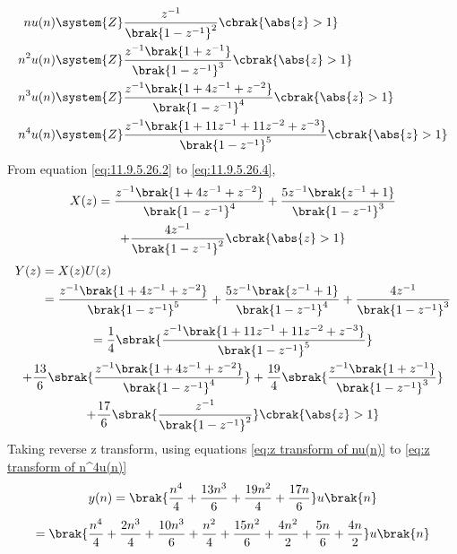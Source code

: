 \documentclass[journal,12pt,twocolumn]{IEEEtran}
\theoremstyle{remark}
\begin{document}
\begin{align}
        n u(n) &\system{Z} \frac{z^{-1}}{\brak{1-z^{-1}}^2} \cbrak{\abs{z}>1} \label{eq:z transform of nu(n)} \\
        n^2 u(n) &\system{Z} \frac{z^{-1}\brak{1+z^{-1}}}{\brak{1-z^{-1}}^3} \cbrak{\abs{z}>1}\label{eq:z transform of n^2u(n)} \\
        n^3 u(n) &\system{Z} \frac{z^{-1}\brak{1+4z^{-1}+z^{-2}}}{\brak{1-z^{-1}}^4} \cbrak{\abs{z}>1}\label{eq:z transform of n^3u(n)} \\
        n^4 u(n) &\system{Z} \frac{z^{-1}\brak{1+11z^{-1}+11z^{-2}+z^{-3}}}{\brak{1-z^{-1}}^5} \cbrak{\abs{z}>1}\label{eq:z transform of n^4u(n)}
    \end{align}
From equation \eqref{eq:11.9.5.26.2} to \eqref{eq:11.9.5.26.4},\\
    \begin{multline}
        X(z) = \frac{z^{-1}\brak{1+4z^{-1}+z^{-2}}}{\brak{1-z^{-1}}^4} + \frac{5z^{-1}\brak{z^{-1}+1}}{\brak{1-z^{-1}}^3}\\ 
        + \frac{4z^{-1}}{\brak{1-z^{-1}}^2} \cbrak{\abs{z}>1}
    \end{multline}
    \begin{align}
         Y(z) &= X(z)U(z)\\
         &=\frac{z^{-1}\brak{1+4z^{-1}+z^{-2}}}{\brak{1-z^{-1}}^5} + \frac{5z^{-1}\brak{z^{-1}+1}}{\brak{1-z^{-1}}^4} + \frac{4z^{-1}}{\brak{1-z^{-1}}^3} 
    \end{align}
    \begin{multline}
        = \frac{1}{4}\sbrak{\frac{z^{-1}\brak{1+11z^{-1}+11z^{-2}+z^{-3}}}{\brak{1-z^{-1}}^5}} \\
        +\frac{13}{6}\sbrak{\frac{z^{-1}\brak{1+4z^{-1}+z^{-2}}}{\brak{1-z^{-1}}^4}} + \frac{19}{4}\sbrak{\frac{z^{-1}\brak{1+z^{-1}}}{\brak{1-z^{-1}}^3}}\\
        + \frac{17}{6}\sbrak{\frac{z^{-1}}{\brak{1-z^{-1}}^2}} \cbrak{\abs{z}>1}
    \end{multline}
    Taking reverse z transform, using equations \eqref{eq:z transform of nu(n)} to \eqref{eq:z transform of n^4u(n)}
    \begin{align}
        y(n) = \brak{\frac{n^4}{4} + \frac{13n^3}{6} + \frac{19n^2}{4} + \frac{17n}{6}} u\brak{n}
    \end{align}
    \begin{multline}
        = \brak{\frac{n^4}{4} + \frac{2n^3}{4} + \frac{10n^3}{6} + \frac{n^2}{4} + \frac{15n^2}{6} + \frac{4n^2}{2} + \frac{5n}{6} + \frac{4n}{2}} u\brak{n}
    \end{multline}
\end{document}
